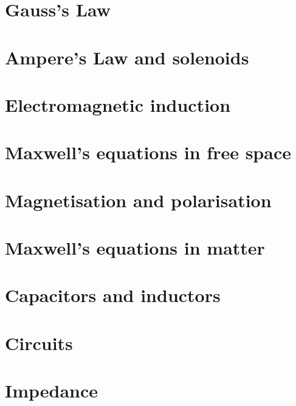 \documentclass[
]{book}
\begin{document}
\hypertarget{gausss-law-1}{%
\chapter{Gauss's Law}\label{gausss-law-1}}

\hypertarget{amperes-law-and-solenoids}{%
\chapter{Ampere's Law and solenoids}\label{amperes-law-and-solenoids}}

\hypertarget{electromagnetic-induction}{%
\chapter{Electromagnetic induction}\label{electromagnetic-induction}}

\hypertarget{maxwells-equations-in-free-space}{%
\chapter{Maxwell's equations in free space}\label{maxwells-equations-in-free-space}}

\hypertarget{magnetisation-and-polarisation}{%
\chapter{Magnetisation and polarisation}\label{magnetisation-and-polarisation}}

\hypertarget{maxwells-equations-in-matter}{%
\chapter{Maxwell's equations in matter}\label{maxwells-equations-in-matter}}

\hypertarget{capacitors-and-inductors}{%
\chapter{Capacitors and inductors}\label{capacitors-and-inductors}}

\hypertarget{circuits}{%
\chapter{Circuits}\label{circuits}}

\hypertarget{impedance}{%
\chapter{Impedance}\label{impedance}}

  
\end{document}
